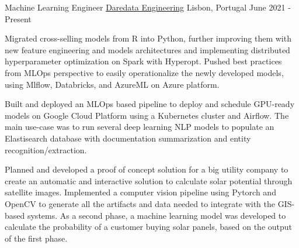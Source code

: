 

\begin{cventries}

  \cventry
    {Machine Learning Engineer} %
    {\href{https://daredata.engineering/home}{Daredata Engineering}} %
    {Lisbon, Portugal} %
    {June 2021 - Present} %
    {
      \begin{cvitems} %
        \item {Migrated cross-selling models from R into Python, further improving them with new feature engineering and models architectures and implementing distributed hyperparameter optimization on Spark with Hyperopt. Pushed best practices from MLOps perspective to easily operationalize the newly developed models, using Mlflow, Databricks, and AzureML on Azure platform.}
        \item {Built and deployed an MLOps based pipeline to deploy and schedule GPU-ready models on Google Cloud Platform using a Kubernetes cluster and Airflow. The main use-case was to run several deep learning NLP models to populate an Elastisearch database with documentation summarization and entity recognition/extraction.}
        \item {Planned and developed a proof of concept solution for a big utility company to create an automatic and interactive solution to calculate solar potential through satellite images. Implemented a computer vision pipeline using Pytorch and OpenCV to generate all the artifacts and data needed to integrate with the GIS-based systems. As a second phase, a machine learning model was developed to calculate the probability of a customer buying solar panels, based on the output of the first phase.}
      \end{cvitems}
    }


\end{cventries}
